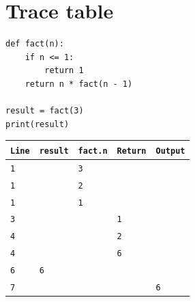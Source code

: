\documentclass[11pt]{article}
\begin{document}
\section*{Trace table}
\begin{verbatim}
def fact(n):
    if n <= 1:
        return 1
    return n * fact(n - 1)

result = fact(3)
print(result)
\end{verbatim}

\begin{center}\small
\begin{tabular}{l l l l l}
\toprule
\texttt{Line} & \texttt{result} & \texttt{fact.n} & \texttt{Return} & \texttt{Output} \\
\midrule
\texttt{1} &  & \texttt{3} &  &  \\
\texttt{1} &  & \texttt{2} &  &  \\
\texttt{1} &  & \texttt{1} &  &  \\
\texttt{3} &  &  & \texttt{1} &  \\
\texttt{4} &  &  & \texttt{2} &  \\
\texttt{4} &  &  & \texttt{6} &  \\
\texttt{6} & \texttt{6} &  &  &  \\
\texttt{7} &  &  &  & \texttt{6} \\
\bottomrule
\end{tabular}
\end{center}
\end{document}
